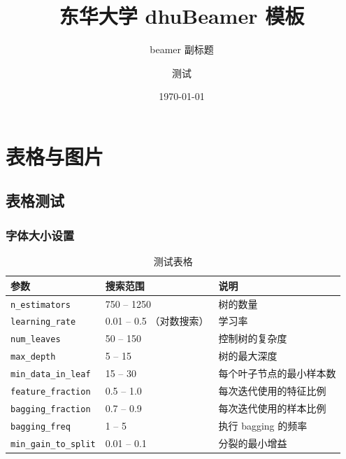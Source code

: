 \documentclass[12pt]{beamer}
\title{东华大学 dhuBeamer 模板}
\subtitle{beamer 副标题}
\author[test]{测试}
\institute{测试学院}
\date{\today}
\begin{document}
\maketitle

\section{表格与图片}
\subsection{表格测试}

\begin{frame}
    \frametitle{字体大小设置}

    \begin{table}[H]
        \centering
        \scriptsize  %
        \captionsetup{font = scriptsize}  %
        \caption{测试表格}
        \begin{tabular}{l|l|l}
            \toprule
            \textbf{参数}                & \textbf{搜索范围}       & \textbf{说明}            \\
            \midrule
            \texttt{n\_estimators}       & 750 -- 1250                              & 树的数量                  \\
            \texttt{learning\_rate}      & 0.01 -- 0.5 （对数搜索）                  & 学习率                   \\
            \texttt{num\_leaves}         & 50 -- 150                                & 控制树的复杂度            \\
            \texttt{max\_depth}          & 5 -- 15                                  & 树的最大深度              \\
            \texttt{min\_data\_in\_leaf} & 15 -- 30                                 & 每个叶子节点的最小样本数  \\
            \texttt{feature\_fraction}   & 0.5 -- 1.0                               & 每次迭代使用的特征比例    \\
            \texttt{bagging\_fraction}   & 0.7 -- 0.9                               & 每次迭代使用的样本比例    \\
            \texttt{bagging\_freq}       & 1 -- 5                                   & 执行 bagging 的频率       \\
            \texttt{min\_gain\_to\_split}& 0.01 -- 0.1                              & 分裂的最小增益            \\
            \bottomrule
        \end{tabular}
        \label{tab: hyperparameter_search_space}
    \end{table}

\end{frame}
\end{document}
